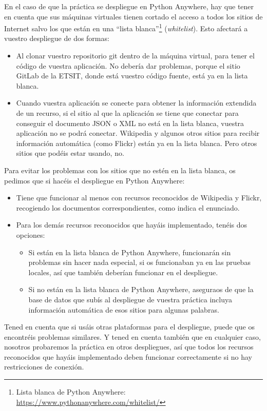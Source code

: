 En el caso de que la práctica se despliegue en Python Anywhere, hay que tener en cuenta que sus máquinas virtuales tienen cortado el acceso a todos los sitios de Internet salvo los que están en una ``lista blanca''\footnote{Lista blanca de Python Anywhere: \url{https://www.pythonanywhere.com/whitelist/}} (\emph{whitelist}). Esto afectará a vuestro despliegue de dos formas:

\begin{itemize}
\item Al clonar vuestro repositorio git dentro de la máquina virtual, para tener el código de vuestra aplicación. No debería dar problemas, porque el sitio GitLab de la ETSIT, donde está vuestro código fuente, está ya en la lista blanca.
\item Cuando vuestra aplicación se conecte para obtener la información extendida de un recurso, si el sitio al que la aplicación se tiene que conectar para conseguir el documento JSON o XML no está en la lista blanca, vuestra aplicación no se podrá conectar. Wikipedia y algunos otros sitios para recibir información automática (como Flickr) están ya en la lista blanca. Pero otros sitios que podéis estar usando, no.
\end{itemize}

Para evitar los problemas con los sitios que no estén en la lista blanca, os pedimos que si hacéis el despliegue en Python Anywhere:

\begin{itemize}
\item Tiene que funcionar al menos con recursos reconocidos de Wikipedia y Flickr, recogiendo los documentos correspondientes, como indica el enunciado.
\item Para los demás recursos reconocidos que hayáis implementado, tenéis dos opciones:
  \begin{itemize}
  \item Si están en la lista blanca de Python Anywhere, funcionarán sin problemas sin hacer nada especial, si os funcionaban ya en las pruebas locales, así que también deberían funcionar en el despliegue.
  \item Si no están en la lista blanca de Python Anywhere, aseguraos de que la base de datos que subís al despliegue de vuestra práctica incluya información automática de esos sitios para algunas palabras.
  \end{itemize}
\end{itemize}

Tened en cuenta que si usáis otras plataformas para el despliegue, puede que os encontréis problemas similares. Y tened en cuenta también que en cualquier caso, nosotros probaremos la práctica en otros despliegues, así que todos los recursos reconocidos que hayáis implementado deben funcionar correctamente si no hay restricciones de conexión.

